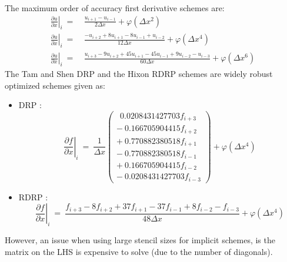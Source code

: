 \documentclass[conf]{new-aiaa}
\begin{document}
The maximum order of accuracy first derivative schemes are:
\begin{equation*}
	\begin{split}
		\left.\frac{\partial{u}}{\partial{x}}\right|_{i}~=&~\frac{u_{i+1}-u_{i-1}}{2\Delta{x}} +\varphi\left(\Delta{x^2}\right) \\
		\left.\frac{\partial{u}}{\partial{x}}\right|_{i}~=&~\frac{-u_{i+2}+8u_{i+1}-8u_{i-1}+u_{i-2}}{12\Delta{x}}  +\varphi\left(\Delta{x^4}\right) \\
		\left.\frac{\partial{u}}{\partial{x}}\right|_{i}~=&~\frac{u_{i+3}-9u_{i+2}+45u_{i+1}-45u_{i-1}+9u_{i-2}-u_{i-3}}{60\Delta{x}}  +\varphi\left(\Delta{x^6}\right) 
	\end{split}
\end{equation*}
The Tam and Shen DRP \cite{DRP} and the Hixon RDRP \cite{RDRP} schemes are widely robust optimized schemes given as:
\begin{itemize}
	\item DRP \cite{DRP}:
		\begin{equation*}
			\left.\frac{\partial{f}}{\partial{x}}\right|_{i}~=~\frac{1}{\Delta{x}}
				\left(\begin{matrix} 	
					~~0.0208431427703f_{i+3} \\
					-~0.166705904415f_{i+2}  \\
					+~0.770882380518f_{i+1}  \\
					-~0.770882380518f_{i-1}  \\
					+~0.166705904415f_{i-2}  \\
					-~0.0208431427703f_{i-3}
				\end{matrix}
				\right)+\varphi\left(\Delta{x^4}\right) 
		\end{equation*}
	\item RDRP \cite{RDRP}:
		\begin{equation*}
			\left.\frac{\partial{f}}{\partial{x}}\right|_{i}~=~\frac{f_{i+3}-8f_{i+2}+37f_{i+1}-37f_{i-1}+8f_{i-2}-f_{i-3}}{48\Delta{x}}+\varphi\left(\Delta{x^4}\right) 
		\end{equation*}
\end{itemize}
However, an issue when using large stencil sizes for implicit schemes, is the matrix on the LHS is expensive to solve (due to the number of diagonals). 
\end{document}

